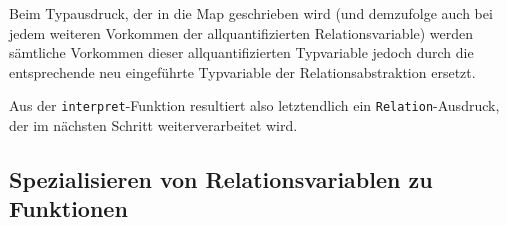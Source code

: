 Beim Typausdruck, der in die Map geschrieben wird (und demzufolge auch bei jedem weiteren Vorkommen der allquantifizierten
Relationsvariable) werden sämtliche Vorkommen dieser allquantifizierten Typvariable jedoch durch die entsprechende neu
eingeführte Typvariable der Relationsabstraktion ersetzt.

Aus der \texttt{interpret}-Funktion resultiert also letztendlich ein \texttt{Relation}-Ausdruck, der im nächsten Schritt weiterverarbeitet wird.




%
%
%
%


\subsection{Spezialisieren von Relationsvariablen zu Funktionen}

\label{sec:specialise-relvars}

